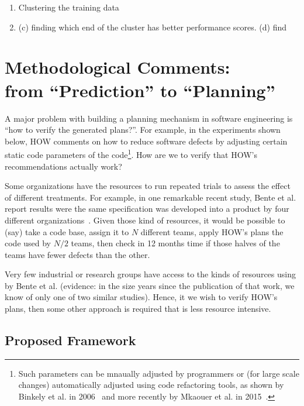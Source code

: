 \documentclass[conference]{IEEEtran}
\newcommand{\be}{\begin{enumerate}}
\newcommand{\ee}{\end{enumerate}}
\begin{document}
{\be
\item Clustering the training data 
\item 
(c) finding which end of the cluster has better performance scores.
(d) find
\ee

\section{Methodological Comments:\\ from ``Prediction'' to ``Planning''}
A major  problem with building a planning mechanism in software engineering is ``how to verify the generated
plans?''. For example,  in the experiments shown below,  HOW comments  on how to reduce
software defects by adjusting certain static code parameters of the code\footnote{Such parameters can be mnaually adjusted by programmers or (for large scale changes) automatically adjusted using code refactoring
tools, as shown by Binkely et al. in 2006~\cite{Binkley2006} and more recently by Mkaouer et al. in 2015~\cite{Mkaouer15}.}. How are we to verify that HOW's recommendations actually work? 

Some organizations have the resources to 
run repeated trials to assess the effect of different treatments.
For example, in one remarkable recent study, Bente et al. report results
were the same specification was developed into a product by four different organizations~\cite{Anda2009}. Given those kind of resources, it would be possible
to (say) take a code base, assign it to $N$ different teams, apply
HOW's plans the code used by  $N/2$ teams, then check in 12 months time
if those halves of the teams have fewer defects than the other.  

Very few industrial or research groups have access
to the kinds of resources using by Bente et al. (evidence: in the size years since the
publication of that work, we know of only one of two similar studies). Hence, it
we wish to verify HOW's plans, then some other approach is required that is less
resource intensive.

\subsection{Proposed Framework}

}
\end{document}
